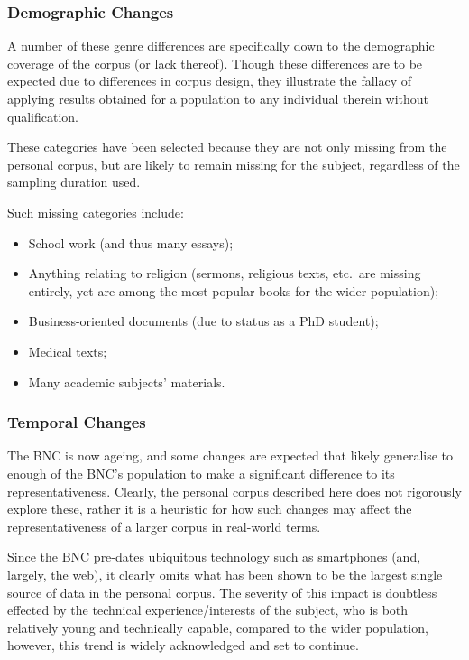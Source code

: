 \subsubsection{Demographic Changes}
A number of these genre differences are specifically down to the demographic coverage of the corpus (or lack thereof).  Though these differences are to be expected due to differences in corpus design, they illustrate the fallacy of applying results obtained for a population to any individual therein without qualification.

These categories have been selected because they are not only missing from the personal corpus, but are likely to remain missing for the subject, regardless of the sampling duration used.

Such missing categories include:
\begin{itemize}
    \item School work (and thus many essays);
    \item Anything relating to religion (sermons, religious texts, etc.\ are missing entirely, yet are among the most popular books for the wider population);
    \item Business-oriented documents (due to status as a PhD student);
    \item Medical texts;
    \item Many academic subjects' materials.
\end{itemize}


%






\subsubsection{Temporal Changes}
The BNC is now ageing, and some changes are expected that likely generalise to enough of the BNC's population to make a significant difference to its representativeness.  Clearly, the personal corpus described here does not rigorously explore these, rather it is a heuristic for how such changes may affect the representativeness of a larger corpus in real-world terms.


Since the BNC pre-dates ubiquitous technology such as smartphones (and, largely, the web), it clearly omits what has been shown to be the largest single source of data in the personal corpus.  The severity of this impact is doubtless effected by the technical experience/interests of the subject, who is both relatively young and technically capable, compared to the wider population, however, this trend is widely acknowledged and set to continue.

